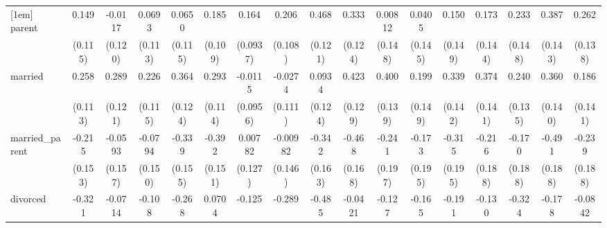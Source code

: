 {\begin{tabular}{l*{16}{c}}
[1em]
parent              &       0.149         &     -0.0117         &      0.0693         &      0.0650         &       0.185         &       0.164         &       0.206         &       0.468\sym{***}&       0.333\sym{**} &     0.00812         &      0.0405         &       0.150         &       0.173         &       0.233         &       0.387\sym{**} &       0.262         \\
                    &     (0.115)         &     (0.120)         &     (0.113)         &     (0.115)         &     (0.109)         &    (0.0937)         &     (0.108)         &     (0.121)         &     (0.124)         &     (0.148)         &     (0.145)         &     (0.149)         &     (0.144)         &     (0.148)         &     (0.143)         &     (0.138)         \\
[1em]
married             &       0.258\sym{*}  &       0.289\sym{*}  &       0.226\sym{*}  &       0.364\sym{**} &       0.293\sym{*}  &     -0.0115         &     -0.0274         &      0.0934         &       0.423\sym{**} &       0.400\sym{**} &       0.199         &       0.339\sym{*}  &       0.374\sym{**} &       0.240         &       0.360\sym{*}  &       0.186         \\
                    &     (0.113)         &     (0.121)         &     (0.115)         &     (0.124)         &     (0.114)         &    (0.0956)         &     (0.111)         &     (0.124)         &     (0.129)         &     (0.139)         &     (0.149)         &     (0.142)         &     (0.141)         &     (0.135)         &     (0.140)         &     (0.141)         \\
[1em]
married\_parent      &      -0.215         &     -0.0593         &     -0.0794         &      -0.339\sym{*}  &      -0.392\sym{**} &     0.00782         &    -0.00982         &      -0.342\sym{*}  &      -0.468\sym{**} &      -0.241         &      -0.173         &      -0.315         &      -0.216         &      -0.170         &      -0.491\sym{**} &      -0.239         \\
                    &     (0.153)         &     (0.157)         &     (0.150)         &     (0.155)         &     (0.151)         &     (0.127)         &     (0.146)         &     (0.163)         &     (0.168)         &     (0.197)         &     (0.195)         &     (0.195)         &     (0.188)         &     (0.188)         &     (0.188)         &     (0.188)         \\
[1em]
divorced            &      -0.321\sym{*}  &     -0.0714         &      -0.108         &      -0.268         &      0.0704         &      -0.125         &      -0.289         &      -0.485\sym{**} &     -0.0421         &      -0.127         &      -0.165         &      -0.191         &      -0.130         &      -0.324         &      -0.178         &     -0.0842         \\

\end{tabular}}
